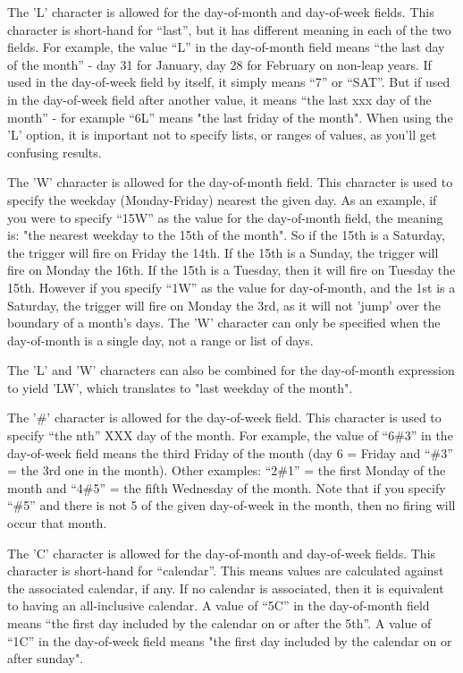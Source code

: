 \documentclass{InsightBook}
\begin{document}
The 'L' character is allowed for the day-of-month and day-of-week
fields. This character is short-hand for ``last'', but it has different
meaning in each of the two fields. For example, the value ``L'' in the
day-of-month field means ``the last day of the month'' - day 31 for
January, day 28 for February on non-leap years. If used in the
day-of-week field by itself, it simply means ``7'' or ``SAT''. But if used
in the day-of-week field after another value, it means ``the last xxx
day of the month'' - for example ``6L'' means "the last friday of the
month". When using the 'L' option, it is important not to specify
lists, or ranges of values, as you'll get confusing results.

The 'W' character is allowed for the day-of-month field. This
character is used to specify the weekday (Monday-Friday) nearest the
given day. As an example, if you were to specify ``15W'' as the value
for the day-of-month field, the meaning is: "the nearest weekday to
the 15th of the month". So if the 15th is a Saturday, the trigger will
fire on Friday the 14th. If the 15th is a Sunday, the trigger will
fire on Monday the 16th. If the 15th is a Tuesday, then it will fire
on Tuesday the 15th. However if you specify ``1W'' as the value for
day-of-month, and the 1st is a Saturday, the trigger will fire on
Monday the 3rd, as it will not 'jump' over the boundary of a month's
days. The 'W' character can only be specified when the day-of-month is
a single day, not a range or list of days.

The 'L' and 'W' characters can also be combined for the day-of-month
expression to yield 'LW', which translates to "last weekday of the
month".

The '\#' character is allowed for the day-of-week field. This character
is used to specify ``the nth'' XXX day of the month. For example, the
value of ``6\#3'' in the day-of-week field means the third Friday of the
month (day 6 = Friday and ``\#3'' = the 3rd one in the month). Other
examples: ``2\#1'' = the first Monday of the month and ``4\#5'' = the fifth
Wednesday of the month. Note that if you specify ``\#5'' and there is not
5 of the given day-of-week in the month, then no firing will occur
that month.

The 'C' character is allowed for the day-of-month and day-of-week
fields. This character is short-hand for ``calendar''. This means values
are calculated against the associated calendar, if any. If no calendar
is associated, then it is equivalent to having an all-inclusive
calendar. A value of ``5C'' in the day-of-month field means ``the first
day included by the calendar on or after the 5th''. A value of ``1C'' in
the day-of-week field means "the first day included by the calendar on
or after sunday".
\end{document}
